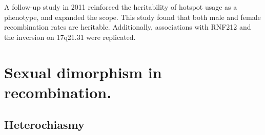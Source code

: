 A follow-up study in 2011 reinforced the heritability of hotspot usage as a phenotype, and expanded the scope\cite{Fledel-Alon2011}.
This study found that both male and female recombination rates are heritable.
Additionally, associations with RNF212 and the inversion on 17q21.31 were replicated.



\section{Sexual dimorphism in recombination.}
\subsection{Heterochiasmy}


